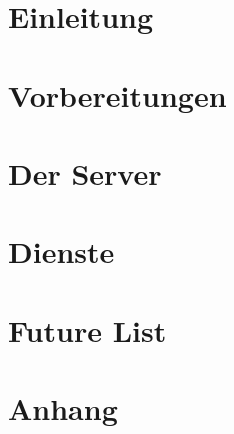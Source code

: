 \documentclass[11pt,a4paper,titlepage,openright,multicol]{scrbook}
\begin{document}
\frontmatter

\mainmatter



\tableofcontents

\part{Einleitung}
\label{part:Einleitung}





\part{Vorbereitungen}
\label{part:Vorbereitungen}




\part{Der Server}
\label{part:Der Server}

 

\part{Dienste}
\label{part:Dienste}




\part{Future List}
\label{part:Future List}
%

\backmatter
\appendix
\part{Anhang}
\label{part:Anhang}



\printglossary

\listoffigures

\listoftables

\lstlistoflistings

\printindex

\end{document}
